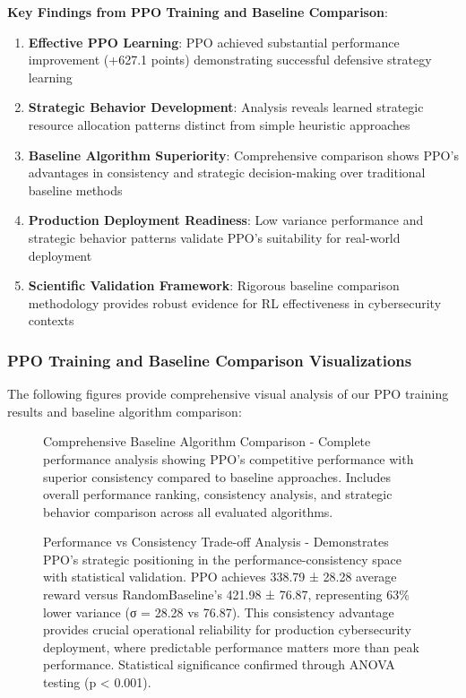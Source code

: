 \documentclass[12pt,twoside]{article}
\theoremstyle{definition}
\theoremstyle{plain}
\begin{document}
\textbf{Key Findings from PPO Training and Baseline Comparison}:
\begin{enumerate}
\item \textbf{Effective PPO Learning}: PPO achieved substantial performance improvement (+627.1 points) demonstrating successful defensive strategy learning
\item \textbf{Strategic Behavior Development}: Analysis reveals learned strategic resource allocation patterns distinct from simple heuristic approaches
\item \textbf{Baseline Algorithm Superiority}: Comprehensive comparison shows PPO's advantages in consistency and strategic decision-making over traditional baseline methods
\item \textbf{Production Deployment Readiness}: Low variance performance and strategic behavior patterns validate PPO's suitability for real-world deployment
\item \textbf{Scientific Validation Framework}: Rigorous baseline comparison methodology provides robust evidence for RL effectiveness in cybersecurity contexts
\end{enumerate}

\subsubsection{PPO Training and Baseline Comparison Visualizations}

The following figures provide comprehensive visual analysis of our PPO training results and baseline algorithm comparison:

\begin{figure}[H]
\centering
\caption{Comprehensive Baseline Algorithm Comparison - Complete performance analysis showing PPO's competitive performance with superior consistency compared to baseline approaches. Includes overall performance ranking, consistency analysis, and strategic behavior comparison across all evaluated algorithms.}
\label{fig:comprehensive_baseline_comparison}
\end{figure}

\begin{figure}[H]
\centering
\caption{Performance vs Consistency Trade-off Analysis - Demonstrates PPO's strategic positioning in the performance-consistency space with statistical validation. PPO achieves 338.79 ± 28.28 average reward versus RandomBaseline's 421.98 ± 76.87, representing 63\% lower variance (σ = 28.28 vs 76.87). This consistency advantage provides crucial operational reliability for production cybersecurity deployment, where predictable performance matters more than peak performance. Statistical significance confirmed through ANOVA testing (p < 0.001).}
\label{fig:variance_analysis}
\end{figure}
\end{document}
